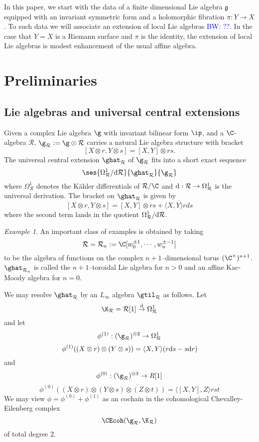 \documentclass[12pt]{amsart}
\theoremstyle{definition}
\theoremstyle{remark}
\newtheorem{eg}[theorem]{Example}
\newcommand{\R}{\mathcal{R}}
\def\d{{\rm d}}
\def\fg{\mathfrak{g}}
\def\brian{\textcolor{blue}{BW: }\textcolor{blue}}
\begin{document}
In this paper, we start with the data of a finite dimensional Lie algebra $\fg$ equipped with an invariant symmetric form and a holomorphic fibration $\pi : Y \to X$. 
To such data we will associate an extension of local Lie algebras \brian{??}.
In the case that $Y = X$ is a Riemann surface and $\pi$ is the identity, the extension of local Lie algebras is modest enhancement of the usual affine algebra.


\section{Preliminaries}
\subsection{Lie algebras and universal central extensions}



Given a complex Lie algebra $\g$ with invariant bilinear form $\ip$, and a $\C$-algebra $\R$, $ \g_{\R} := \g \otimes \R$ carries a natural Lie algebra structure with bracket
\[
[X \otimes r, Y \otimes s] = [X,Y] \otimes rs.
\]
The universal central extension $\ghat_{\R}$ of $\g_{\R}$ fits into a short exact sequence
\[
\ses{\Omega^1_{\R} / \d \R}{\ghat_{\R}}{\g_{\R}}
\]
where $\Omega^1_{\R}$ denotes the K\"{a}hler differentials of $\R/\C$ and $\d: \R \rightarrow \Omega^{1}_{\R}$ is the universal derivation. The bracket on $\ghat_{\R}$ is given by 
\[
[X \otimes r, Y \otimes s] =  [X,Y] \otimes rs + \overline{\langle X, Y \rangle r ds}
\]
where the second term lands in the quotient $\Omega^1_{\R} / \d \R$. 

\begin{eg}

An important class of examples is obtained by taking
\[
\R= \R_n := \C[w^{\pm 1}_0, \cdots, w^{\pm -1}_n]
\]
to be the algebra of functions on the complex $n+1$--dimensional torus $(\C^{\times})^{n+1}$. $\ghat_{\R_n}$ is called the $n+1$--toroidal Lie algebra for $n >0$ and an affine Kac-Moody algebra for $n=0$. 

\end{eg}

We may resolve $\ghat_{\R}$ by an $L_{\infty}$ algebra $\gtil_{\R}$ as follows. Let 
\[
\K_{\R} = \R[1] \overset{\d}{\rightarrow} \Omega^{1}_{\R}
\]
and let
$$ \phi^{(1)}: (\g_{\R})^{\otimes 2} \rightarrow \Omega^1_{\R} $$
$$ \phi^{(1)} ((X \otimes r) \otimes (Y \otimes s)) = \langle X, Y \rangle (r \d s - s \d r) $$
and 
$$ \phi^{(0)}: (\g_{\R})^{\otimes 3} \rightarrow R[1] $$
$$ \phi^{(0)}( (X \otimes r)\otimes(Y \otimes s) \otimes (Z \otimes t)) = \langle [X,Y], Z \rangle rst $$
We may view $\phi = \phi^{(0)} + \phi^{(1)}$ as an cochain in the cohomological Chevalley-Eilenberg complex $$ \CEcoh(\g_{\R}, \K_{\R}) $$ of total degree $2$.
\end{document}
